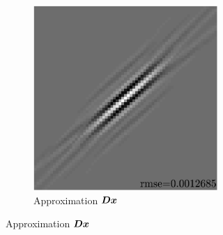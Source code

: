 \begin{figure}[!ht]
\begin{subfigure}[b]{0.3\textwidth}
\begin{subfigure}[b]{1\textwidth}
	\includegraphics[width=\textwidth]{figures/variable_support/xp_128x128_sc2_angl1_K3_S3_node4_variable_approx.pdf}
	\caption{Approximation $\bm{D}\bm{x}$}
	\end{subfigure}
\end{subfigure}
\begin{subfigure}[b]{0.3\textwidth}\centering

\end{subfigure}
\end{figure}
